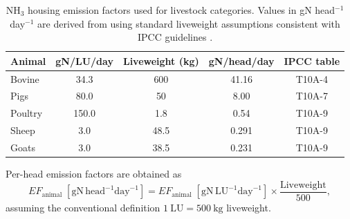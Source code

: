 \begin{table}[htbp]
\centering
\begin{threeparttable}
\caption{NH$_3$ housing emission factors used for livestock categories. Values in gN head$^{-1}$ day$^{-1}$ are derived from \citet{Misselbrook_2000} using standard liveweight assumptions consistent with IPCC guidelines \cite{IPPC_2006_V10}.}
\label{tab:livestock_housing_factors}
\begin{tabular}{lcccc}
\toprule
Animal & gN/LU/day & Liveweight (kg) & gN/head/day & IPCC table \\
\midrule
Bovine  & 34.3  & 600  & 41.16 & T10A-4 \\
Pigs    & 80.0  & 50   & 8.00  & T10A-7 \\
Poultry & 150.0 & 1.8  & 0.54  & T10A-9 \\
Sheep   & 3.0   & 48.5 & 0.291 & T10A-9 \\
Goats   & 3.0   & 38.5 & 0.231 & T10A-9 \\
\bottomrule
\end{tabular}
\begin{tablenotes}[flushleft]
\footnotesize
\item Per-head emission factors are obtained as
\[
EF_{\mathrm{animal}} \; [\mathrm{gN \, head}^{-1}\mathrm{day}^{-1}]
=
EF_{\mathrm{animal}} \; [\mathrm{gN \, LU}^{-1}\mathrm{day}^{-1}]
\times \frac{\mathrm{Liveweight}}{500},
\]
assuming the conventional definition \(1\ \mathrm{LU} = 500\ \mathrm{kg}\) liveweight.
\end{tablenotes}
\end{threeparttable}
\end{table}

